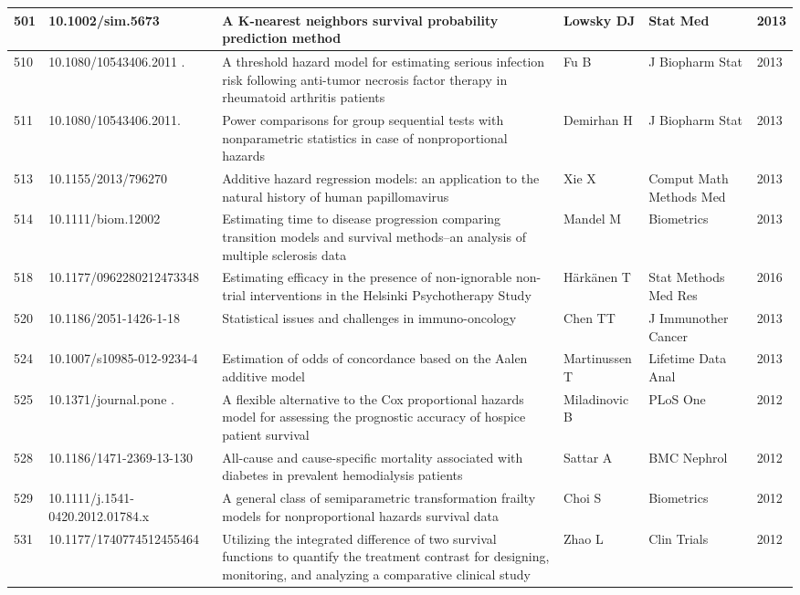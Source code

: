 \begin{landscape}
\begin{longtable}{|p{0.3in}|p{1.8in}|p{2.4in}|p{0.68in}|p{0.89in}|p{0.3in}|}
501 & 10.1002/sim.5673    & A K-nearest neighbors survival probability prediction method & Lowsky DJ & Stat Med & 2013 \\ \hline 
510 & 10.1080/10543406.2011 .\-616973   & A threshold hazard model for estimating serious infection risk following anti-tumor necrosis factor therapy in rheumatoid arthritis patients & Fu B & J Biopharm Stat & 2013 \\ \hline 
511 & 10.1080/10543406.2011.\-616975   & Power comparisons for group sequential tests with nonparametric statistics in case of nonproportional hazards & Demirhan H & J Biopharm Stat & 2013 \\ \hline 
513 & 10.1155/2013/796270    & Additive hazard regression models: an application to the natural history of human papillomavirus & Xie X & Comput Math Methods Med & 2013 \\ \hline 
514 & 10.1111/biom.12002   & Estimating time to disease progression comparing transition models and survival methods--an analysis of multiple sclerosis data & Mandel M & Biometrics & 2013 \\ \hline 
518 & 10.1177/0962280212473348   & Estimating efficacy in the presence of non-ignorable non-trial interventions in the Helsinki Psychotherapy Study & H\"{a}rk\"{a}nen T & Stat Methods Med Res & 2016 \\ \hline 
520 & 10.1186/2051-1426-1-18   & Statistical issues and challenges in immuno-oncology & Chen TT & J Immunother Cancer & 2013 \\ \hline 
524 & 10.1007/s10985-012-9234-4   & Estimation of odds of concordance based on the Aalen additive model & Martinussen T & Lifetime Data Anal & 2013 \\ \hline 
525 & 10.1371/journal.pone .\-0047804  & A flexible alternative to the Cox proportional hazards model for assessing the prognostic accuracy of hospice patient survival & Miladinovic B & PLoS One & 2012 \\ \hline 
528 & 10.1186/1471-2369-13-130   & All-cause and cause-specific mortality associated with diabetes in prevalent hemodialysis patients & Sattar A & BMC Nephrol & 2012 \\ \hline 
529 & 10.1111/j.1541-0420.2012.01784.x   & A general class of semiparametric transformation frailty models for nonproportional hazards survival data & Choi S & Biometrics & 2012 \\ \hline 
531 & 10.1177/1740774512455464   & Utilizing the integrated difference of two survival functions to quantify the treatment contrast for designing, monitoring, and analyzing a comparative clinical study & Zhao L & Clin Trials & 2012 \\ \hline 

\end{longtable}
\end{landscape}
